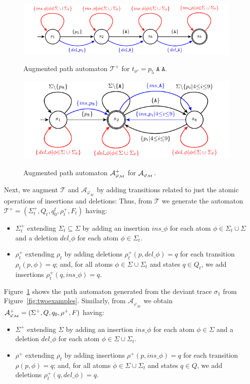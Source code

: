 \begin{figure}[!t]
	\centering
	{\includegraphics[width=.7\textwidth]{images/Tplus}}
	\caption{Augmented path automaton $\mathcal{T}^+$ for $t_{\sigma'}=p_5\;\texttt{A}\;\texttt{A}$.}\label{fig:tplus}
\end{figure} \begin{figure}[!t]
\centering
{\includegraphics[width=.7\textwidth]{images/Aplus}}
\caption{Augmented path automaton $\mathcal{A}_{\varphi_{\tiny\mathcal{M}}}^+$ for $\mathcal{A}_{\varphi_{\tiny\mathcal{M}}}$.}\label{fig:aplus}
\end{figure}
Next, we augment $\mathcal{T}$ and $\mathcal{A}_{\varphi_{\mathcal{M}}}$ by adding transitions related to just the atomic operations of insertions and deletions: Thus, from $\mathcal{T}$ we generate the automaton $\mathcal{T}^+=(\Sigma_t^+,Q_t,q_0^t,\rho_t^+,F_t)$ having:
\begin{itemize}
	\item $\Sigma_t^+$ extending $\Sigma_t\subseteq \Sigma$ by adding an insertion $\textit{ins\_}\phi$ for each atom $\phi\in\Sigma_t\cup\Sigma$ and a deletion $\textit{del\_}\phi$ for each atom  $\phi\in\Sigma_t$.
	\item $\rho_t^+$ extending $\rho_t$ by adding deletions $\rho_t^+(p,\textit{del\_}\phi)=q$ for each transition $\rho_t(p,\phi)=q$; and, for all atoms $\phi\in\Sigma\cup\Sigma_t$ and states $q\in Q_t$, we add insertions $\rho_t^+(q,\textit{ins\_}\phi)=q$.
\end{itemize}
Figure~\ref{fig:tplus} shows the path automaton generated from the deviant trace $\sigma_1$ from Figure~\ref{fig:twoexamples}. Similarly, from $\mathcal{A}_{\varphi_{\mathcal{M}}}$ we obtain $\mathcal{A}_{\varphi_{\tiny\mathcal{M}}}^+=(\Sigma^+,Q,q_0,\rho^+,F)$ having:
\begin{itemize}
	\item $\Sigma^+$ extending $\Sigma$ by adding an insertion $\textit{ins\_}\phi$ for each atom $\phi\in\Sigma$ and a deletion $\textit{del\_}\phi$ for each atom  $\phi\in\Sigma\cup\Sigma_t$.
\item $\rho^+$ extending $\rho_t$ by adding insertions $\rho^+(p,\textit{ins\_}\phi)=q$ for each transition $\rho(p,\phi)=q$; and, for all atoms $\phi\in\Sigma\cup\Sigma_t$ and states $q\in Q$, we add deletions $\rho_t^+(q,\textit{del\_}\phi)=q$.
\end{itemize}
